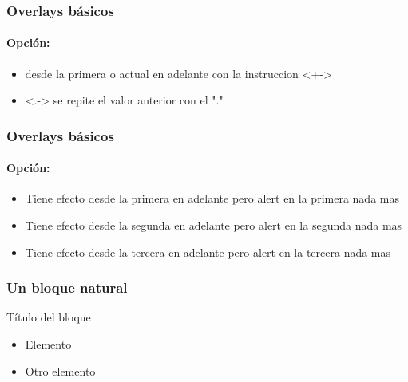 \documentclass{beamer}
\begin{document}

  \begin{frame}
    \frametitle{Overlays básicos} %
    \framesubtitle{Opción: }
    \begin{itemize}
      \item <+-> desde la primera o actual en adelante con la instruccion <+->
      \item <.-> se repite el valor anterior con el "."
    \end{itemize}
  \end{frame}


  \begin{frame}
    \frametitle{Overlays básicos} %
    \framesubtitle{Opción: }
    \begin{itemize}
      \item<1-|alert@1> Tiene efecto desde la primera en adelante pero alert en la primera nada mas
      \item<2-|alert@2> Tiene efecto desde la segunda en adelante pero alert en la segunda nada mas
      \item<3-|alert@3> Tiene efecto desde la tercera en adelante pero alert en la tercera nada mas
    \end{itemize}
  \end{frame}


  \begin{frame}
    \frametitle{Un bloque natural} 
    \begin{block}{Título del bloque}
    \begin{itemize}
      \item Elemento
      \item Otro elemento
    \end{itemize}
    \end{block}
  \end{frame}

\end{document}

